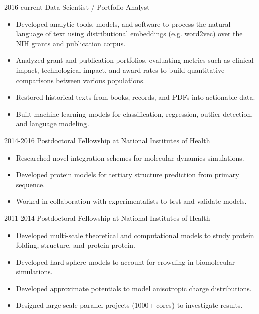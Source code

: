 \documentclass[]{scrartcl}
\begin{document}
\begin{cleanCV}

  
  \WorkExperience
{2016-current}
{Data Scientist / Portfolio Analyst}
{
  \begin{itemize}
  \item Developed analytic tools, models, and software to process the natural language of text using distributional embeddings (e.g. word2vec) over the NIH grants and publication corpus.
    \item Analyzed grant and publication portfolios, evaluating metrics such as clinical impact, technological impact, and award rates to build quantitative comparisons between various populations.
    \item Restored historical texts from books, records, and PDFs into actionable data.
    \item Built machine learning models for classification, regression, outlier detection, and language modeling.
  \end{itemize}
}

 
\WorkExperience
{2014-2016}
{Postdoctoral Fellowship at National Institutes of Health}
{
  \begin{itemize}
  \item Researched novel integration schemes for molecular dynamics simulations.
  \item Developed protein models for tertiary structure prediction from primary sequence.
  \item Worked in collaboration with experimentalists to test and validate models. 
  \end{itemize}
}

\WorkExperience
{2011-2014}
{Postdoctoral Fellowship at National Institutes of Health}
{
  \begin{itemize}
  \item Developed multi-scale theoretical and computational models to study protein folding, structure, and protein-protein.
  \item Developed hard-sphere models to account for crowding in biomolecular simulations.
  \item Developed approximate potentials to model anisotropic charge distributions.
  \item Designed large-scale parallel projects (1000+ cores) to investigate results.
  \end{itemize}
}


\end{cleanCV}
\end{document}
